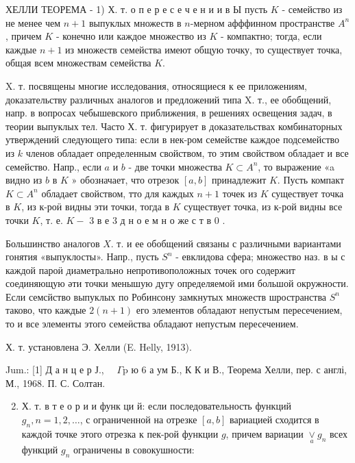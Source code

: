 \documentclass[10pt]{article}
\begin{document}
ХЕЛЛИ ТЕОРЕМА - 1) Х. т. о п е р е с е ч е н и и в Ы пусть $K$ - семейство из не менее чем $n+1$ выпуклых множеств в $n$-мерном афффинном пространстве $A^{n}$, причем $K$ - конечно или каждое множество из $K$ - компактно; тогда, если каждые $n+1$ из множеств семейства имеют общую точку, то существует точка, общая всем множествам семейства $K$.



X. т. посвящены многие исследования, относящиеся к ее приложениям, доказательству различных аналогов и предложений типа X. т., ее обобщений, напр. в вопросах чебышевского приближения, в решениях освещения задач, в теории выпуклых тел. Часто Х. т. фигурирует в доказательствах комбинаторных утверждений следующего типа: если в нек-ром семействе каждое подсемейство из $k$ членов обладает определенным свойством, то этим свойством обладает и все семейство. Напр., если $a$ и $b$ - две точки множества $K \subset A^{n}$, то выражение «a видно из $b$ в $K$ » обозначает, что отрезок $[a, b]$ принадлежит $K$. Пусть компакт $K \subset A^{n}$ обладает свойством, тто для каждых $n+1$ точек из $K$ существует точка в $K$, из к-роӥ видны эти точки, тогда в $K$ существует точка, из к-рой видны все точки $K$, т. е. $K-$ 3 в е 3 д н о е м н $о$ же с т в 0 .



Большинство аналогов $X$. т. и ее обобщений связаны с различными вариантами гонятия «выпуклосты». Напр., пусть $S^{n}$ - евклидова сфера; множество наз. в ы с каждой пароӥ диаметрально непротивоположных точек ого содержит соединяющую әти точки менышую дугу определяемой ими большой окружности. Если семсйство выпуклых по Робинсону замкнутых множеств шространства $S^{n}$ таково, что каждые $2(n+1)$ его элементов обладают непустым пересечением, то и все элементы этого семеӥства обладают непустым пересечением.



Х. т. установлена Э. Хелли (E. Helly, 1913).



Jum.: [1] Д а н ц е р Ј., $\quad \Gamma \mathrm{p}$ ю 6 а ум Б., К К и В., Теорема Хелли, пер. с англі, М., 1968. П. С. Солтан.



\begin{enumerate}

  \setcounter{enumi}{1}

  \item Х. т. в т е о р и и функ ци й: если последовательность функций $g_{n}, n=1,2, \ldots$, с ограниченной на отрезке $[a, b]$ вариацией сходится в каждой точке этого отрезка к пек-рой функции $g$, причем вариации $\underset{a}{\vee} g_{n}$ всех функций $g_{n}$ ограничены в совокушности:

\end{enumerate}
\end{document}
